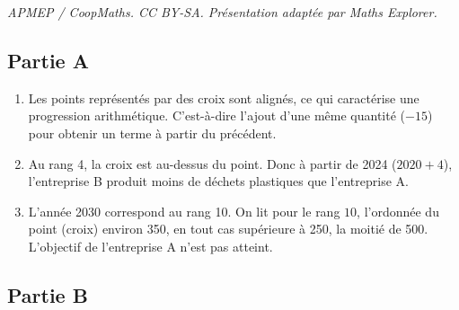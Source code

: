 \documentclass[10pt]{article}
\begin{document}
\noindent\textit{APMEP / CoopMaths. CC BY-SA. Présentation adaptée par Maths Explorer.}\par\medskip
\subsection*{Partie A}
\begin{enumerate}
  \item
Les points représentés par des croix sont alignés, ce qui caractérise une progression arithmétique. C'est-à-dire l'ajout d'une même quantité ($-15$) pour obtenir un terme à partir du précédent.

  \item
Au rang 4, la croix est au-dessus du point. Donc à partir de 2024 ($2020+4$), l'entreprise B produit moins de déchets plastiques que l'entreprise A.

  \item
L'année 2030 correspond au rang 10. On lit pour le rang $10$, l'ordonnée du point (croix) environ 350, en tout cas supérieure à 250, la moitié de 500. L'objectif de l'entreprise A n'est pas atteint.


\end{enumerate}

\subsection*{Partie B}
\end{document}

